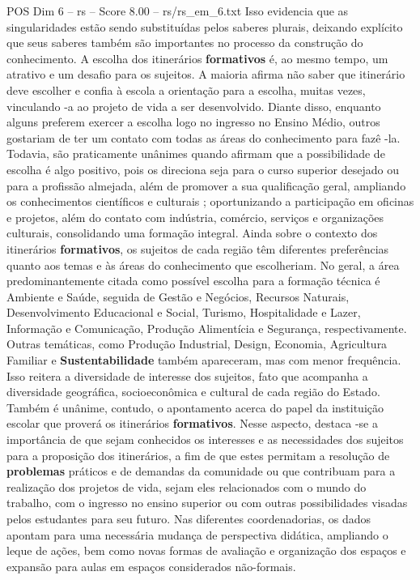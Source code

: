 \begin{textsample}{POS Dim 6 – rs – Score 8.00 – rs/rs\_em\_6.txt}
Isso evidencia que as singularidades estão sendo substituídas pelos saberes plurais, deixando explícito que seus saberes também são importantes no processo da construção do conhecimento.
A escolha dos itinerários \textbf{formativos} é, ao mesmo tempo, um atrativo e um desafio para os sujeitos.
A maioria afirma não saber que itinerário deve escolher e confia à escola a orientação para a escolha, muitas vezes, vinculando -a ao projeto de vida a ser desenvolvido.
Diante disso, enquanto alguns preferem exercer a escolha logo no ingresso no Ensino Médio, outros gostariam de ter um contato com todas as áreas do conhecimento para fazê -la.
Todavia, são praticamente unânimes quando afirmam que a possibilidade de escolha é algo positivo, pois os direciona seja para o curso superior desejado ou para a profissão almejada, além de promover a sua qualificação geral, ampliando os conhecimentos científicos e culturais ; oportunizando a participação em oficinas e projetos, além do contato com indústria, comércio, serviços e organizações culturais, consolidando uma formação integral.
Ainda sobre o contexto dos itinerários \textbf{formativos}, os sujeitos de cada região têm diferentes preferências quanto aos temas e às áreas do conhecimento que escolheriam.
No geral, a área predominantemente citada como possível escolha para a formação técnica é Ambiente e Saúde, seguida de Gestão e Negócios, Recursos Naturais, Desenvolvimento Educacional e Social, Turismo, Hospitalidade e Lazer, Informação e Comunicação, Produção Alimentícia e Segurança, respectivamente.
Outras temáticas, como Produção Industrial, Design, Economia, Agricultura Familiar e \textbf{Sustentabilidade} também apareceram, mas com menor frequência.
Isso reitera a diversidade de interesse dos sujeitos, fato que acompanha a diversidade geográfica, socioeconômica e cultural de cada região do Estado.
Também é unânime, contudo, o apontamento acerca do papel da instituição escolar que proverá os itinerários \textbf{formativos}.
Nesse aspecto, destaca -se a importância de que sejam conhecidos os interesses e as necessidades dos sujeitos para a proposição dos itinerários, a fim de que estes permitam a resolução de \textbf{problemas} práticos e de demandas da comunidade ou que contribuam para a realização dos projetos de vida, sejam eles relacionados com o mundo do trabalho, com o ingresso no ensino superior ou com outras possibilidades visadas pelos estudantes para seu futuro.
Nas diferentes coordenadorias, os dados apontam para uma necessária mudança de perspectiva didática, ampliando o leque de ações, bem como novas formas de avaliação e organização dos espaços e expansão para aulas em espaços considerados não-formais.

\end{textsample}
